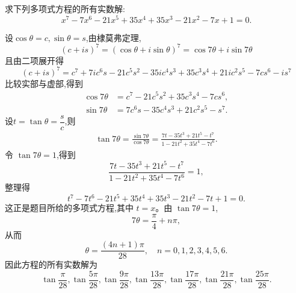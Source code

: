 \begin{questions}
    \question 求下列多项式方程的所有实数解:
    \[
    x^7-7x^6-21x^5+35x^4+35x^3-21x^2-7x+1=0.
    \]
    \begin{solution}
        设$\cos\theta=c, \sin\theta=s$,由棣莫弗定理,
        \[
        (c+is)^7=(\cos\theta+i\sin\theta)^7=\cos7\theta+i\sin7\theta
        \]
        且由二项展开得
        \[
        (c+is)^7=c^7+7ic^6s-21c^5s^2-35ic^4s^3+35c^3s^4+21ic^2s^5-7cs^6-is^7
        \]
        比较实部与虚部,得到
        \begin{align*}
        \cos7\theta&=c^7-21c^5s^2+35c^3s^4-7cs^6,\\
        \sin7\theta&=7c^6s-35c^4s^3+21c^2s^5-s^7.
        \end{align*}
        设$t=\tan\theta=\dfrac{s}{c}$,则
        \begin{align*}
        \tan7\theta=\frac{\sin7\theta}{\cos7\theta}=\frac{7t-35t^3+21t^5-t^7}{1-21t^2+35t^4-7t^6}.
        \end{align*}
        令 $\tan7\theta=1$,得到
        \[
        \frac{7t-35t^3+21t^5-t^7}{1-21t^2+35t^4-7t^6}=1,
        \]
        整理得
        \[
        t^7-7t^6-21t^5+35t^4+35t^3-21t^2-7t+1=0.
        \]
        这正是题目所给的多项式方程,其中 $t=x$。由 $\tan7\theta=1$,
        \[
        7\theta=\frac{\pi}{4}+n\pi,
        \]
        从而
        \[
        \theta=\frac{(4n+1)\pi}{28},\quad n=0,1,2,3,4,5,6.
        \]
        因此方程的所有实数解为
        \[
        \tan\frac{\pi}{28},\tan\frac{5\pi}{28},\tan\frac{9\pi}{28},\tan\frac{13\pi}{28},\tan\frac{17\pi}{28},\tan\frac{21\pi}{28},\tan\frac{25\pi}{28}.
        \]
    \end{solution}

    \question 
\end{questions}
